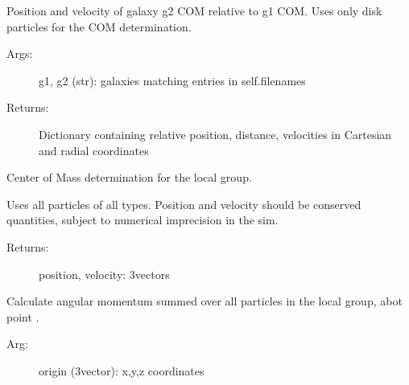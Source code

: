 \documentclass[letterpaper,10pt,english]{sphinxmanual}
\begin{document}
\begin{fulllineitems}
\begin{fulllineitems}
\begin{description}
\end{description}

\end{fulllineitems}


\begin{fulllineitems}
\label{\detokenize{galaxies:galaxy.galaxies.Galaxies.separations}}
Position and velocity of galaxy g2 COM relative to g1 COM. 
Uses only disk particles for the COM determination.
\begin{description}
\item[{Args:}] \leavevmode
g1, g2 (str): galaxies matching entries in self.filenames

\item[{Returns:}] \leavevmode
Dictionary containing relative position, distance, velocities in
Cartesian and radial coordinates

\end{description}

\end{fulllineitems}


\begin{fulllineitems}
\label{\detokenize{galaxies:galaxy.galaxies.Galaxies.total_com}}
Center of Mass determination for the local group.

Uses all particles of all types. Position and velocity should be conserved 
quantities, subject to numerical imprecision in the sim.
\begin{description}
\item[{Returns:}] \leavevmode
position, velocity: 3\sphinxhyphen{}vectors

\end{description}

\end{fulllineitems}


\begin{fulllineitems}
\label{\detokenize{galaxies:galaxy.galaxies.Galaxies.total_angmom}}
Calculate angular momentum summed over all particles in the local group,
abot point .
\begin{description}
\item[{Arg:}] \leavevmode
origin (3\sphinxhyphen{}vector): x,y,z coordinates


\end{description}
\end{fulllineitems}
\end{fulllineitems}
\end{document}

